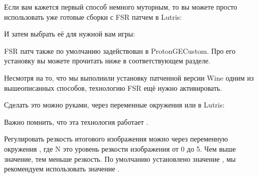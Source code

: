 \documentclass[letterpaper,10pt,russian,openany]{sphinxmanual}
\begin{document}
\sphinxAtStartPar
{}

\sphinxAtStartPar
Если вам кажется первый способ немного муторным, то вы можете просто использовать уже готовые сборки с FSR патчем в Lutris:

\noindent{}

\sphinxAtStartPar
И затем выбрать её для нужной вам игры:

\noindent{}

\sphinxAtStartPar
{}

\sphinxAtStartPar
FSR патч также по умолчанию задействован в Proton\sphinxhyphen{}GE\sphinxhyphen{}Custom.
Про его установку вы можете прочитать ниже в соответствующем разделе.

\sphinxAtStartPar
{}

\sphinxAtStartPar
Несмотря на то, что мы выполнили установку патченной версии Wine одним из вышеописанных способов,
технологию FSR ещё нужно активировать.

\sphinxAtStartPar
Сделать это можно руками, через переменные окружения  или в Lutris:

\noindent{}

\sphinxAtStartPar
Важно помнить, что эта технология работает .

\sphinxAtStartPar
Регулировать резкость итогового изображения можно через переменную окружения ,
где N \sphinxhyphen{} это уровень резкости изображения от 0 до 5. Чем выше значение, тем меньше резкость.
По умолчанию установлено значение , мы рекомендуем использовать значение .

\sphinxAtStartPar
{}

\sphinxAtStartPar
{}

\ignorespaces 
\end{document}
